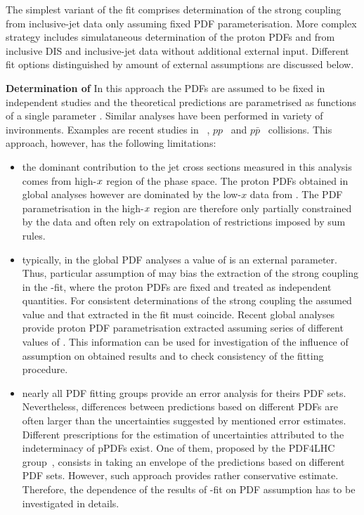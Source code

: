 The simplest variant of the fit comprises determination of the strong coupling from inclusive-jet data only assuming fixed PDF parameterisation. More complex strategy includes simulataneous determination of the proton PDFs and \asz from inclusive DIS and inclusive-jet data without additional external input. Different fit options distinguished by amount of external assumptions are discussed below.
 
{\flushleft \textbf{Determination of \asz}}\newline
In this approach the PDFs are assumed to be fixed in independent studies and the theoretical predictions are parametrised as functions of a single parameter \asz. Similar analyses have been performed in variety of invironments. Examples are recent studies in \ep~\cite{}, $pp$~\cite{} and $p\bar{p}$~\cite{} collisions. This approach, however, has the following limitations:
\begin{itemize}
 \item the dominant contribution to the jet cross sections measured in this analysis comes from high-$\mbox{${x}$}$ region of the phase space. The proton PDFs obtained in global analyses however are dominated by the low-$x$ data from \hera. The PDF parametrisation in the high-$\mbox{${x}$}$ region are therefore only partially constrained by the data and often rely on extrapolation of restrictions imposed by sum rules.
 \item typically, in the global PDF analyses a value of \asz is an external parameter. Thus, particular assumption of \asz may bias the extraction of the strong coupling in the \as-fit, where the proton PDFs are fixed and treated as independent quantities. For consistent determinations of the strong coupling the assumed value and that extracted in the fit must coincide. Recent global analyses provide proton PDF parametrisation extracted assuming series of different values of \asz. This information can be used for investigation of the influence of \asz assumption on obtained results and to check consistency of the fitting procedure.
 \item nearly all PDF fitting groups provide an error analysis for theirs PDF sets. Nevertheless, differences between predictions based on different PDFs are often larger than the uncertainties suggested by mentioned error estimates. Different prescriptions for the estimation of uncertainties attributed to the indeterminacy of pPDFs exist. One of them, proposed by the PDF4LHC group~\cite{pdf4lhc:2011}, consists in taking an envelope of the predictions based on different PDF sets. However, such approach provides rather conservative estimate. Therefore, the dependence of the results of \as-fit on PDF assumption has to be investigated in details.
\end{itemize}

